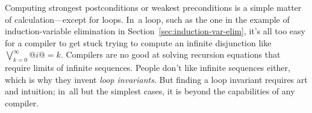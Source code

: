 \documentclass[blockstyle,preprint,natbib,nocopyrightspace]{sigplanconf}
\newcommand\secref[1]{Section~\ref{sec:#1}}
\begin{document}
Computing strongest postconditions or weakest
preconditions is a simple matter of calculation---except for loops.
In~a loop, such as the one in the example of induction-variable elimination in
\secref{induction-var-elim}, 
it's all too easy for a compiler to get stuck trying to compute an
infinite disjunction like $\bigvee_{k=0}^{\infty} @i@=k$.
Compilers are no good at solving recursion
equations that require limits of infinite sequences.
%
People don't like infinite sequences either, which is why they invent
\emph{loop invariants}. 
But finding a loop invariant requires art and intuition;
in~all but the simplest cases, it is beyond the capabilities of any
compiler.

\end{document}

